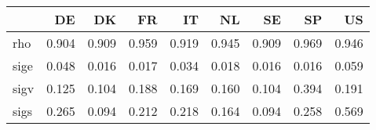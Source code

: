 \begin{tabular}{lrrrrrrrr}
\toprule
{} &     DE &     DK &     FR &     IT &     NL &     SE &     SP &     US \\
\midrule
rho  &  0.904 &  0.909 &  0.959 &  0.919 &  0.945 &  0.909 &  0.969 &  0.946 \\
sige &  0.048 &  0.016 &  0.017 &  0.034 &  0.018 &  0.016 &  0.016 &  0.059 \\
sigv &  0.125 &  0.104 &  0.188 &  0.169 &  0.160 &  0.104 &  0.394 &  0.191 \\
sigs &  0.265 &  0.094 &  0.212 &  0.218 &  0.164 &  0.094 &  0.258 &  0.569 \\
\bottomrule
\end{tabular}
